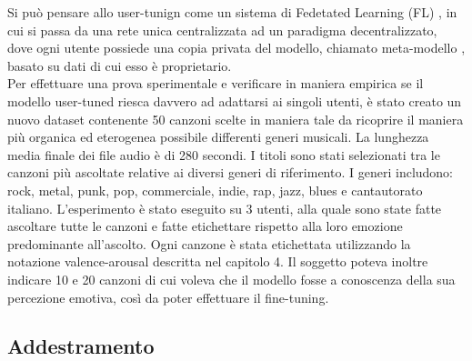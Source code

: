 \documentclass[11pt]{report}
\begin{document}
Si può pensare allo user-tunign come un sistema di Fedetated Learning (FL) \cite{li2020federated}, in cui si passa da una rete unica centralizzata ad un paradigma decentralizzato, dove ogni utente possiede una copia privata del modello, chiamato meta-modello \cite{vanschoren2019meta}, basato su dati di cui esso è proprietario. \\

Per effettuare una prova sperimentale e verificare in maniera empirica se il modello user-tuned riesca davvero ad adattarsi ai singoli utenti, è stato creato un nuovo dataset contenente 50 canzoni scelte in maniera tale da ricoprire il maniera più organica ed eterogenea possibile differenti generi musicali. La lunghezza media finale dei file audio è di 280 secondi. I titoli sono stati selezionati tra le canzoni più ascoltate relative ai diversi generi di riferimento. I generi includono: rock, metal, punk, pop, commerciale, indie, rap, jazz, blues e cantautorato italiano. L'esperimento è stato eseguito su 3 utenti, alla quale sono state fatte ascoltare tutte le canzoni e fatte etichettare rispetto alla loro emozione predominante all'ascolto. Ogni canzone è stata etichettata utilizzando la notazione valence-arousal descritta nel capitolo 4. Il soggetto poteva inoltre indicare 10 e 20 canzoni di cui voleva che il modello fosse a conoscenza della sua percezione emotiva, così da poter effettuare il fine-tuning.

\subsection{Addestramento}
\end{document}
